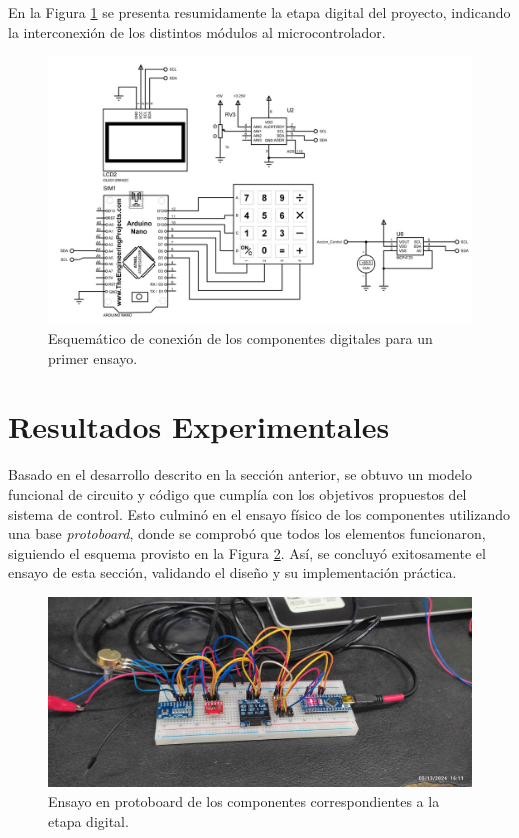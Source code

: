 En la Figura \ref{F:esquematico_proteus} se presenta resumidamente la etapa digital del proyecto, indicando la interconexión de los distintos módulos al microcontrolador.
\begin{figure}[H]
    \centering
    \includegraphics[width=\textwidth]{./imagenes/proteus_esquema2.jpg}
    \caption{Esquemático de conexión de los componentes digitales para un primer ensayo.}
    \label{F:esquematico_proteus}
\end{figure}

\section{Resultados Experimentales}
Basado en el desarrollo descrito en la sección anterior, se obtuvo un modelo funcional de circuito y código que cumplía con los objetivos propuestos del sistema de control. Esto culminó en el ensayo físico de los componentes utilizando una base \textit{protoboard}, donde se comprobó que todos los elementos funcionaron, siguiendo el esquema provisto en la Figura \ref{F:ensayo_digital}. Así, se concluyó exitosamente el ensayo de esta sección, validando el diseño y su implementación práctica.
\begin{figure}[H]
    \centering
    \includegraphics[scale=0.08]{./imagenes/ensayo_digital.jpg}
    \caption{Ensayo en protoboard de los componentes correspondientes a la etapa digital.}
    \label{F:ensayo_digital}
\end{figure}